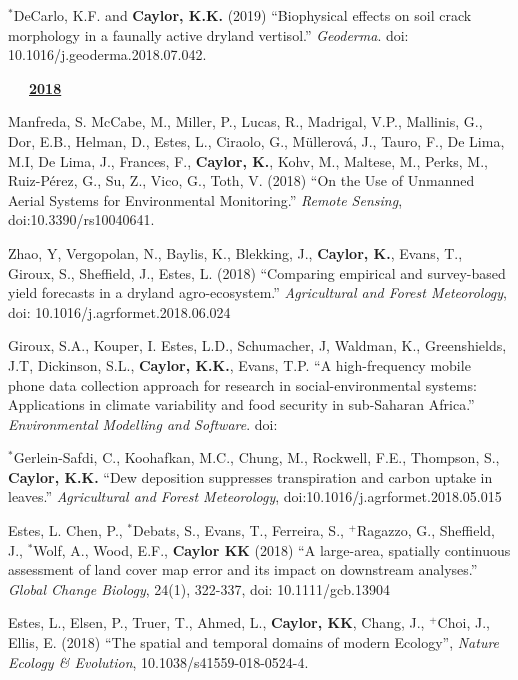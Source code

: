 \documentclass[10pt]{report}
\begin{document}
\begin{etaremune}
\item $^{*}$DeCarlo, K.F. and \textbf{Caylor, K.K.} (2019) ``Biophysical effects on soil crack morphology in a faunally active dryland vertisol.'' {\em Geoderma}. doi: 10.1016/j.geoderma.2018.07.042.

\mbox{\ \ \ \underline{\textbf{2018}}}

\item Manfreda, S. McCabe, M., Miller, P., Lucas, R.,  Madrigal, V.P., Mallinis, G., Dor, E.B., Helman, D., Estes, L., Ciraolo, G., Müllerová, J., Tauro, F., De Lima, M.I, De Lima, J., Frances, F., \textbf{Caylor, K.}, Kohv, M., Maltese, M., Perks, M., Ruiz-Pérez, G., Su, Z., Vico, G., Toth, V. (2018) ``On the Use of Unmanned Aerial Systems for Environmental Monitoring.'' {\em Remote Sensing}, doi:10.3390/rs10040641.


\item Zhao, Y, Vergopolan, N., Baylis, K., Blekking, J.,  \textbf{Caylor, K.}, Evans, T., Giroux, S., Sheffield, J., Estes, L. (2018) ``Comparing empirical and survey-based yield forecasts in a dryland agro-ecosystem.'' {\em Agricultural and Forest Meteorology}, doi: 10.1016/j.agrformet.2018.06.024
 
\item Giroux, S.A., Kouper, I. Estes, L.D., Schumacher, J, Waldman, K., Greenshields, J.T, Dickinson, S.L., \textbf{Caylor, K.K.}, Evans, T.P.  ``A high-frequency mobile phone data collection approach for research in social-environmental systems: Applications in climate variability and food security in sub-Saharan Africa.'' {\em Environmental Modelling and Software}. doi:


\item $^{*}$Gerlein-Safdi, C., Koohafkan, M.C., Chung, M., Rockwell, F.E., Thompson, S., \textbf{Caylor, K.K.} ``Dew deposition suppresses transpiration and carbon uptake in leaves.'' {\em Agricultural and Forest Meteorology}, doi:10.1016/j.agrformet.2018.05.015

\item Estes, L. Chen, P.,  $^{*}$Debats, S., Evans, T., Ferreira, S., $^{+}$Ragazzo, G., Sheffield, J., $^{*}$Wolf, A., Wood, E.F.,  \textbf{Caylor KK} (2018) ``A large-area, spatially continuous assessment of land cover map error and its impact on downstream analyses.'' {\em Global Change Biology}, 24(1), 322-337, doi: 10.1111/gcb.13904

\item Estes, L., Elsen, P., Truer, T., Ahmed, L., \textbf{Caylor, KK}, Chang, J., $^{+}$Choi, J., Ellis, E. (2018) ``The spatial and temporal domains of modern Ecology'', {\em Nature Ecology \& Evolution}, 10.1038/s41559-018-0524-4.


\end{etaremune}
\end{document}
